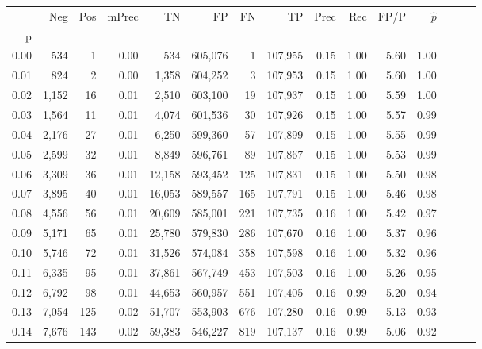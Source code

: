 \begin{tabular}{rrrrrrrrrrrrrrr}
\toprule
{} &     Neg &    Pos & mPrec &       TN &       FP &       FN &       TP &  Prec &   Rec &  FP/P & $\hat{p}$ \\
p    &         &        &       &          &          &          &          &       &       &       &           \\
\midrule
0.00 &     534 &      1 &  0.00 &      534 &  605,076 &        1 &  107,955 &  0.15 &  1.00 &  5.60 &      1.00 \\
0.01 &     824 &      2 &  0.00 &    1,358 &  604,252 &        3 &  107,953 &  0.15 &  1.00 &  5.60 &      1.00 \\
0.02 &   1,152 &     16 &  0.01 &    2,510 &  603,100 &       19 &  107,937 &  0.15 &  1.00 &  5.59 &      1.00 \\
0.03 &   1,564 &     11 &  0.01 &    4,074 &  601,536 &       30 &  107,926 &  0.15 &  1.00 &  5.57 &      0.99 \\
0.04 &   2,176 &     27 &  0.01 &    6,250 &  599,360 &       57 &  107,899 &  0.15 &  1.00 &  5.55 &      0.99 \\
0.05 &   2,599 &     32 &  0.01 &    8,849 &  596,761 &       89 &  107,867 &  0.15 &  1.00 &  5.53 &      0.99 \\
0.06 &   3,309 &     36 &  0.01 &   12,158 &  593,452 &      125 &  107,831 &  0.15 &  1.00 &  5.50 &      0.98 \\
0.07 &   3,895 &     40 &  0.01 &   16,053 &  589,557 &      165 &  107,791 &  0.15 &  1.00 &  5.46 &      0.98 \\
0.08 &   4,556 &     56 &  0.01 &   20,609 &  585,001 &      221 &  107,735 &  0.16 &  1.00 &  5.42 &      0.97 \\
0.09 &   5,171 &     65 &  0.01 &   25,780 &  579,830 &      286 &  107,670 &  0.16 &  1.00 &  5.37 &      0.96 \\
0.10 &   5,746 &     72 &  0.01 &   31,526 &  574,084 &      358 &  107,598 &  0.16 &  1.00 &  5.32 &      0.96 \\
0.11 &   6,335 &     95 &  0.01 &   37,861 &  567,749 &      453 &  107,503 &  0.16 &  1.00 &  5.26 &      0.95 \\
0.12 &   6,792 &     98 &  0.01 &   44,653 &  560,957 &      551 &  107,405 &  0.16 &  0.99 &  5.20 &      0.94 \\
0.13 &   7,054 &    125 &  0.02 &   51,707 &  553,903 &      676 &  107,280 &  0.16 &  0.99 &  5.13 &      0.93 \\
0.14 &   7,676 &    143 &  0.02 &   59,383 &  546,227 &      819 &  107,137 &  0.16 &  0.99 &  5.06 &      0.92 \\

\end{tabular}
